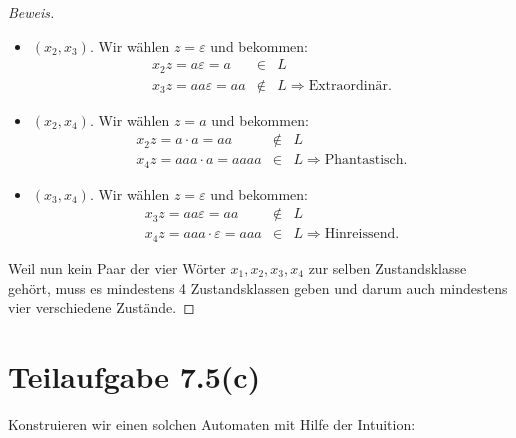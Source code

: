 \documentclass[11pt]{article} %
\theoremstyle{definition}
\begin{document}
\begin{proof}[Beweis]
\begin{itemize}
\item $(x_2, x_3)$. Wir wählen $z = \varepsilon$ und bekommen:
\begin{eqnarray*}
x_2z = a\varepsilon = a &\in& L \\
x_3z = aa\varepsilon = aa &\notin& L \Rightarrow \textrm{Extraordinär.} 
\end{eqnarray*}

\item $(x_2, x_4)$. Wir wählen $z =a$ und bekommen:
\begin{eqnarray*}
x_2z = a\cdot a = aa &\notin& L \\
x_4z = aaa\cdot a = aaaa &\in& L \Rightarrow \textrm{Phantastisch.} 
\end{eqnarray*}

\item $(x_3, x_4)$. Wir wählen $z =\varepsilon$ und bekommen:
\begin{eqnarray*}
x_3z = aa\varepsilon = aa &\notin& L \\
x_4z = aaa\cdot \varepsilon = aaa &\in& L \Rightarrow \textrm{Hinreissend.}
\end{eqnarray*}

\end{itemize}

Weil nun kein Paar der vier Wörter $x_1, x_2, x_3, x_4$ zur selben Zustandsklasse gehört, muss es mindestens 4 Zustandsklassen geben und darum auch mindestens vier verschiedene Zustände.
\end{proof}

\section*{Teilaufgabe 7.5(c)}

Konstruieren wir einen solchen Automaten mit Hilfe der Intuition:
\end{document}
